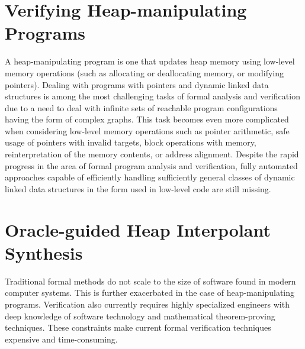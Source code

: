 \section{Verifying Heap-manipulating Programs}
A heap-manipulating program is one that updates heap memory using low-level memory operations (such as allocating or deallocating memory, or modifying pointers). Dealing with programs with pointers and dynamic linked data structures is among the most challenging tasks of formal analysis and verification due to a need to deal with infinite sets of reachable program configurations having the form of complex graphs. This task becomes even more complicated when considering low-level memory operations such as pointer arithmetic, safe usage of pointers with invalid targets, block operations with memory, reinterpretation of the memory contents, or address alignment. Despite the rapid progress in the area of formal program analysis and verification, fully automated approaches capable of efficiently handling sufficiently general classes of dynamic
linked data structures in the form used in low-level code are still missing.

\section{Oracle-guided Heap Interpolant Synthesis}
Traditional formal methods do not scale to the size of software found in modern computer systems. This is further exacerbated in the case of heap-manipulating programs. Verification also currently requires highly specialized engineers with deep knowledge of software technology and mathematical theorem-proving techniques. These constraints make current formal verification techniques expensive and time-consuming.





